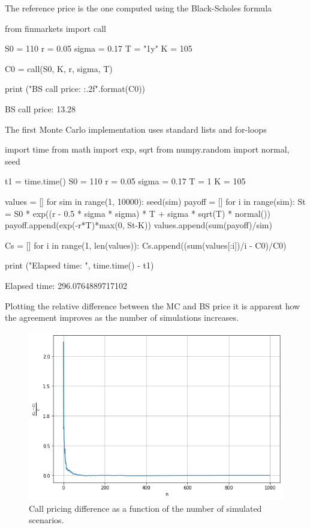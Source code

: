 \cprotEnv\begin{solution}
The reference price is the one computed using the Black-Scholes formula
\begin{ipython}
from finmarkets import call

S0 = 110
r = 0.05
sigma = 0.17
T = "1y"
K = 105

C0 = call(S0, K, r, sigma, T)

print ("BS call price: {:.2f}".format(C0))
\end{ipython}
\begin{ioutput}
BS call price: 13.28
\end{ioutput}

The first Monte Carlo implementation uses standard lists and for-loops
\begin{ipython}
import time
from math import exp, sqrt
from numpy.random import normal, seed

t1 = time.time()
S0 = 110
r = 0.05
sigma = 0.17
T = 1
K = 105

values = []
for sim in range(1, 10000):
  seed(sim)
  payoff = []
  for i in range(sim):
    St = S0 * exp((r - 0.5 * sigma * sigma) * T + sigma * sqrt(T) * normal())
    payoff.append(exp(-r*T)*max(0, St-K))
  values.append(sum(payoff)/sim)

Cs = []
for i in range(1, len(values)):
  Cs.append((sum(values[:i])/i - C0)/C0)

print ("Elapsed time: ", time.time() - t1)
\end{ipython}
\begin{ioutput}
Elapsed time:  296.0764889717102
\end{ioutput}

Plotting the relative difference between the MC and BS price it is apparent how the agreement improves as the number of simulations increases.

\begin{figure}[htbp]
\centering
\includegraphics[width=0.7\linewidth]{figures/ex_call_pricing_error}
\caption{Call pricing difference as a function of the number of simulated scenarios.}
\end{figure}


\end{solution}
